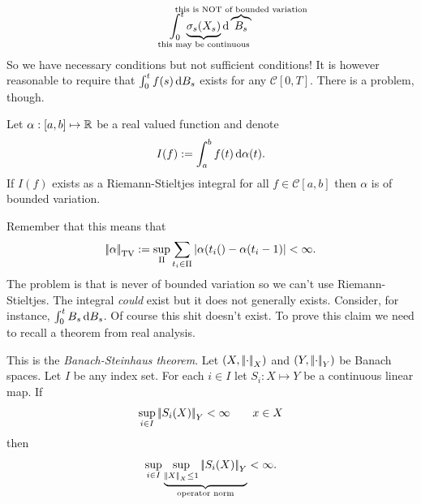 \documentclass[crop=false, class=article]{standalone}
\begin{document}
\begin{equation*}
	\int_{0}^{t}\underbrace{\sigma_{s}(X_{s})}_{\mathclap{\text{this may be continuous}}}\dif \overbrace{B_{s}}^{\mathclap{\text{this is NOT of bounded variation}}}
\end{equation*}
So we have necessary conditions but not sufficient conditions! It is however reasonable to require that $\int_{0}^{t}f(s)\mathop{}\!\mathrm{d} B_{s}$ exists for any $\mathcal{C}[0,T]$. There is a problem, though.
\begin{proposition}
	Let $\alpha:[a,b]\mapsto\mathbb{R}$ be a real valued function and denote
	\begin{equation*}
		I(f):=\int_{a}^{b}f(t)\mathop{}\!\mathrm{d}\alpha(t).
	\end{equation*}
	If $I(f)$ exists as a Riemann-Stieltjes integral for all $f\in\mathcal{C}[a,b]$ then $\alpha$ is of bounded variation.
\end{proposition}
Remember that this means that 
\begin{equation*}
	\left|\negthinspace\left|\alpha\right|\negthinspace\right|_{\mathrm{TV}}:=\sup_{\Pi}\sum_{t_i\in\Pi}|\alpha(t_{i}()-\alpha(t_{i}-1)|<\infty.
\end{equation*}
The problem is that \brm{} is never of bounded variation so we can't use Riemann-Stieltjes. The integral \textit{could} exist but it does not generally exists. Consider, for instance, $\int_{0}^{t}B_{s}\mathop{}\!\mathrm{d} B_{s}$. Of course this shit doesn't exist.
To prove this claim we need to recall a theorem from real analysis.
\begin{revise}
	This is the \emph{Banach-Steinhaus theorem}. Let $(X,\left|\negthinspace\left|\cdot\right|\negthinspace\right|_{X})$ and $(Y,\left|\negthinspace\left|\cdot\right|\negthinspace\right|_{Y})$ be Banach spaces. Let $I$ be any index set. For each $i\in I$ let $S_{i}:X\mapsto Y$ be a continuous linear map. If
	\begin{equation*}
		\sup_{i\in I}\left|\negthinspace\left|S_{i}(X)\right|\negthinspace\right|_{Y}<\infty\qquad x\in X
	\end{equation*}
	then
	\begin{equation*}
		\sup_{i\in I}\underbrace{\sup_{\left|\negthinspace\left|X\right|\negthinspace\right|_{X}\leq1}\left|\negthinspace\left|S_{i}(X)\right|\negthinspace\right|_{Y}}_{\text{operator norm}}<\infty.
	\end{equation*}
\end{revise}
\end{document}

